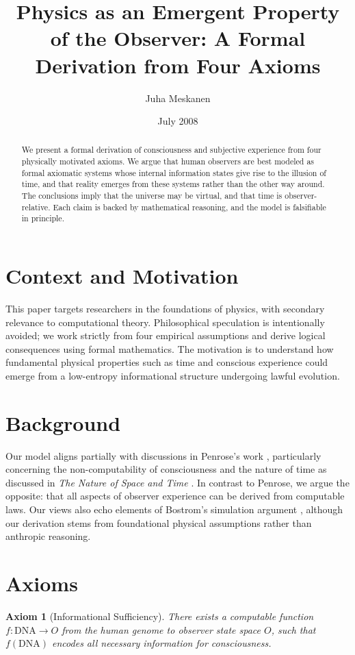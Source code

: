 \documentclass[11pt]{article}
\title{Physics as an Emergent Property of the Observer: A Formal Derivation from Four Axioms}
\author{Juha Meskanen}
\date{July 2008}
\newtheorem{axiom}{Axiom}
\begin{document}
\maketitle

\begin{abstract}
We present a formal derivation of consciousness and subjective experience from four physically motivated axioms. We argue that human observers are best modeled as formal axiomatic systems whose internal information states give rise to the illusion of time, and that reality emerges from these systems rather than the other way around. The conclusions imply that the universe may be virtual, and that time is observer-relative. Each claim is backed by mathematical reasoning, and the model is falsifiable in principle.
\end{abstract}

\section{Context and Motivation}
This paper targets researchers in the foundations of physics, with secondary relevance to computational theory. Philosophical speculation is intentionally avoided; we work strictly from four empirical assumptions and derive logical consequences using formal mathematics. The motivation is to understand how fundamental physical properties such as time and conscious experience could emerge from a low-entropy informational structure undergoing lawful evolution.

\section{Background}
Our model aligns partially with discussions in Penrose's work \cite{penrose1989emperor}, particularly concerning the 
non-computability of consciousness and the nature of time as discussed in \textit{The Nature of Space and Time} \cite{hawking1996nature}. 
In contrast to Penrose, we argue the opposite: that all aspects of observer experience can be derived from computable laws. 
Our views also echo elements of Bostrom's simulation argument \cite{bostrom2003}, although our derivation stems from foundational 
physical assumptions rather than anthropic reasoning.


\section{Axioms}

\begin{axiom}[Informational Sufficiency]
There exists a computable function $f: \text{DNA} \rightarrow O$ from the human genome to observer state space $O$, such that $f(\text{DNA})$ encodes all necessary information for consciousness.
\end{axiom}
\end{document}
